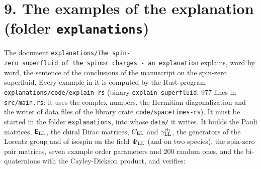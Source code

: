 \documentclass[
  10pt,
]{article}
\begin{document}
\hypertarget{the-examples-of-the-explanation-folder-explanations}{%
\section{\texorpdfstring{9. The examples of the explanation (folder
\texttt{explanations})}{9. The examples of the explanation (folder explanations)}}\label{the-examples-of-the-explanation-folder-explanations}}

The document
\texttt{explanations/The\ spin-zero\ superfluid\ of\ the\ spinor\ charges\ -\ an\ explanation}
explains, word by word, the sentence of the conclusions of the
manuscript on the spin-zero superfluid. Every example in it is computed
by the Rust program \texttt{explanations/code/explain-rs} (binary
\texttt{explain\_superfluid}, 977 lines in \texttt{src/main.rs}; it uses
the complex numbers, the Hermitian diagonalization and the writer of
data files of the library crate \texttt{code/spacetimes-rs}). It must be
started in the folder \texttt{explanations}, into whose \texttt{data/}
it writes. It builds the Pauli matrices, \(\mathsf E_{\rm LL}\), the
chiral Dirac matrices, \(C_{\rm LL}\) and \(\gamma^{\rm ch}_{\rm LL}\),
the generators of the Lorentz group and of isospin on the field
\(\Psi_{\rm LL}\) (and on two species), the spin-zero pair matrices,
seven example order parameters and 200 random ones, and the
bi-quaternions with the Cayley-Dickson product, and verifies:
\end{document}
